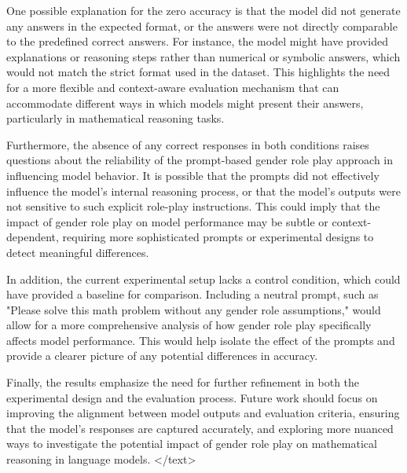 \documentclass{article}
\begin{document}
One possible explanation for the zero accuracy is that the model did not generate any answers in the expected format, or the answers were not directly comparable to the predefined correct answers. For instance, the model might have provided explanations or reasoning steps rather than numerical or symbolic answers, which would not match the strict format used in the dataset. This highlights the need for a more flexible and context-aware evaluation mechanism that can accommodate different ways in which models might present their answers, particularly in mathematical reasoning tasks.

Furthermore, the absence of any correct responses in both conditions raises questions about the reliability of the prompt-based gender role play approach in influencing model behavior. It is possible that the prompts did not effectively influence the model's internal reasoning process, or that the model's outputs were not sensitive to such explicit role-play instructions. This could imply that the impact of gender role play on model performance may be subtle or context-dependent, requiring more sophisticated prompts or experimental designs to detect meaningful differences.

In addition, the current experimental setup lacks a control condition, which could have provided a baseline for comparison. Including a neutral prompt, such as "Please solve this math problem without any gender role assumptions," would allow for a more comprehensive analysis of how gender role play specifically affects model performance. This would help isolate the effect of the prompts and provide a clearer picture of any potential differences in accuracy.

Finally, the results emphasize the need for further refinement in both the experimental design and the evaluation process. Future work should focus on improving the alignment between model outputs and evaluation criteria, ensuring that the model's responses are captured accurately, and exploring more nuanced ways to investigate the potential impact of gender role play on mathematical reasoning in language models.
</text>
\end{document}
